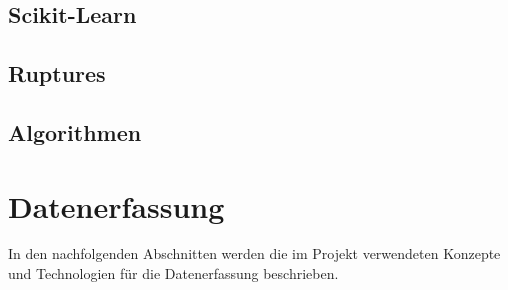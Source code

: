 \documentclass{report}
\begin{document}
\subsection{Scikit-Learn}
\subsection{Ruptures}
\subsection{Algorithmen}

\section{Datenerfassung}
In den nachfolgenden Abschnitten werden die im Projekt verwendeten Konzepte und Technologien für die Datenerfassung beschrieben.
\end{document}

